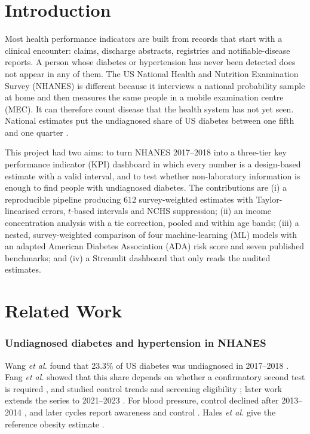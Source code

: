 \section{Introduction}
Most health performance indicators are built from records that start with a clinical encounter: claims, discharge abstracts, registries and notifiable-disease reports. A person whose diabetes or hypertension has never been detected does not appear in any of them. The US National Health and Nutrition Examination Survey (NHANES) is different because it interviews a national probability sample at home and then measures the same people in a mobile examination centre (MEC). It can therefore count disease that the health system has not yet seen. National estimates put the undiagnosed share of US diabetes between one fifth and one quarter \cite{wang2021,fang2022,gwira2024}.

This project had two aims: to turn NHANES 2017--2018 into a three-tier key performance indicator (KPI) dashboard in which every number is a design-based estimate with a valid interval, and to test whether non-laboratory information is enough to find people with undiagnosed diabetes. The contributions are (i) a reproducible pipeline producing 612 survey-weighted estimates with Taylor-linearised errors, $t$-based intervals and NCHS suppression; (ii) an income concentration analysis with a tie correction, pooled and within age bands; (iii) a nested, survey-weighted comparison of four machine-learning (ML) models with an adapted American Diabetes Association (ADA) risk score and seven published benchmarks; and (iv) a Streamlit dashboard that only reads the audited estimates.

\section{Related Work}
\subsubsection*{Undiagnosed diabetes and hypertension in NHANES} Wang \textit{et al.} found that 23.3\% of US diabetes was undiagnosed in 2017--2018 \cite{wang2021}. Fang \textit{et al.} showed that this share depends on whether a confirmatory second test is required \cite{fang2022}, and studied control trends and screening eligibility \cite{fang2021}; later work extends the series to 2021--2023 \cite{gwira2024,cdc_ndsr}. For blood pressure, control declined after 2013--2014 \cite{muntner2020,muntner2022}, and later cycles report awareness and control \cite{ostchega2020,fryar2024}. Hales \textit{et al.} give the reference obesity estimate \cite{hales2020}.

